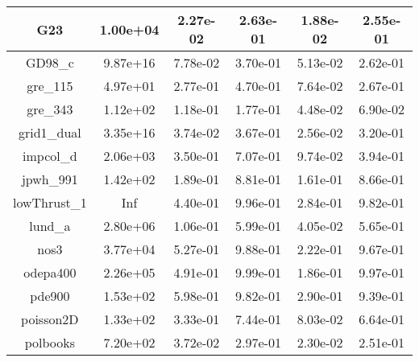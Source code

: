 \documentclass[11pt]{article}          %
\begin{document}
\begin{table}[!t]
\begin{tabular}{|c|c|c|c|c|c|}
G23                   & 1.00e+04             & 2.27e-02                 & 2.63e-01              & 1.88e-02             & 2.55e-01         \\ \hline
GD98\_c               & 9.87e+16             & 7.78e-02                 & 3.70e-01              & 5.13e-02             & 2.62e-01         \\ \hline
gre\_115              & 4.97e+01             & 2.77e-01                 & 4.70e-01              & 7.64e-02             & 2.67e-01         \\ \hline
gre\_343              & 1.12e+02             & 1.18e-01                 & 1.77e-01              & 4.48e-02             & 6.90e-02         \\ \hline
grid1\_dual           & 3.35e+16             & 3.74e-02                 & 3.67e-01              & 2.56e-02             & 3.20e-01         \\ \hline
impcol\_d             & 2.06e+03             & 3.50e-01                 & 7.07e-01              & 9.74e-02             & 3.94e-01         \\ \hline
jpwh\_991             & 1.42e+02             & 1.89e-01                 & 8.81e-01              & 1.61e-01             & 8.66e-01         \\ \hline
lowThrust\_1          & Inf                  & 4.40e-01                 & 9.96e-01              & 2.84e-01             & 9.82e-01         \\ \hline
lund\_a               & 2.80e+06             & 1.06e-01                 & 5.99e-01              & 4.05e-02             & 5.65e-01         \\ \hline
nos3                  & 3.77e+04             & 5.27e-01                 & 9.88e-01              & 2.22e-01             & 9.67e-01         \\ \hline
odepa400              & 2.26e+05             & 4.91e-01                 & 9.99e-01              & 1.86e-01             & 9.97e-01         \\ \hline
pde900                & 1.53e+02             & 5.98e-01                 & 9.82e-01              & 2.90e-01             & 9.39e-01         \\ \hline
poisson2D             & 1.33e+02             & 3.33e-01                 & 7.44e-01              & 8.03e-02             & 6.64e-01         \\ \hline
polbooks              & 7.20e+02             & 3.72e-02                 & 2.97e-01              & 2.30e-02             & 2.51e-01         \\ \hline

\end{tabular}
\end{table}
\end{document}
